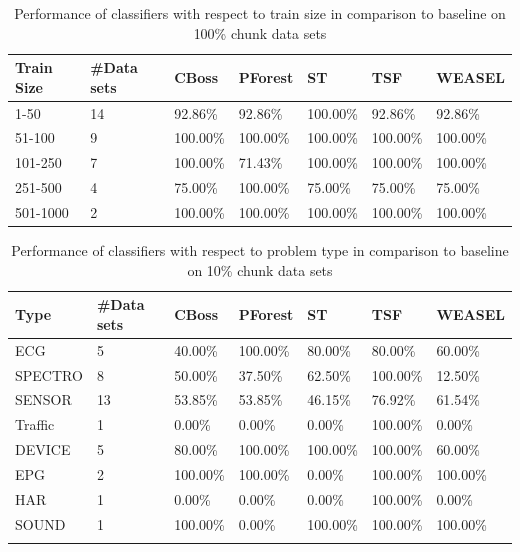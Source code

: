         \begin{table}[!ht]
            \setlength\extrarowheight{2pt} %
            \begin{tabularx}{\textwidth}{|X|X|X|X|X|X|X|}
            \hline
            \textbf{Train Size} & \textbf{\#Data sets} & \textbf{CBoss} & \textbf{PForest} & \textbf{ST} & \textbf{TSF} & \textbf{WEASEL} \\ \hline
                1-50 & 14 & 92.86\% & 92.86\% & 100.00\% & 92.86\% & 92.86\% \\ \hline
                51-100 & 9 & 100.00\% & 100.00\% & 100.00\% & 100.00\% & 100.00\% \\ \hline
                101-250 & 7 & 100.00\% & 71.43\% & 100.00\% & 100.00\% & 100.00\% \\ \hline
                251-500 & 4 & 75.00\% & 100.00\% & 75.00\% & 75.00\% & 75.00\% \\ \hline
                501-1000 & 2 &100.00\% & 100.00\% & 100.00\% & 100.00\% & 100.00\% \\ \hline
            \end{tabularx}
            \caption{Performance of classifiers with respect to train size in comparison to baseline on 100\% chunk data sets}
        \end{table}
    
        
\begin{table}[!htb]
	\setlength\extrarowheight{2pt} %
	\begin{tabularx}{\textwidth}{|X|X|X|X|X|X|X|}
	\hline
	\textbf{Type} & \textbf{\#Data sets} & \textbf{CBoss} & \textbf{PForest} & \textbf{ST} & \textbf{TSF} & \textbf{WEASEL} \\ \hline
		ECG & 5 & 40.00\% & 100.00\% & 80.00\% & 80.00\% & 60.00\% \\ \hline
		SPECTRO & 8 &50.00\% & 37.50\% & 62.50\% & 100.00\% & 12.50\% \\ \hline
		SENSOR & 13 & 53.85\% & 53.85\% & 46.15\% & 76.92\% & 61.54\% \\ \hline
		Traffic & 1 & 0.00\% & 0.00\% & 0.00\% & 100.00\% & 0.00\% \\ \hline
		DEVICE & 5 & 80.00\% & 100.00\% & 100.00\% & 100.00\% & 60.00\% \\ \hline
		EPG & 2 & 100.00\% & 100.00\% & 0.00\% & 100.00\% & 100.00\% \\ \hline
		HAR & 1 & 0.00\% & 0.00\% & 0.00\% & 100.00\% & 0.00\% \\ \hline
		SOUND & 1 & 100.00\% & 0.00\% & 100.00\% & 100.00\% & 100.00\% \\ \hline
  \caption{Performance of classifiers with respect to problem type in comparison to baseline on 10\% chunk data sets}
  \end{tabularx}
\end{table}

